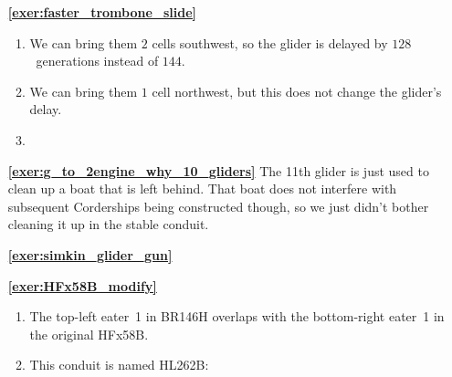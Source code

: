 \begin{multicols}{2}
\begin{itemize}[leftmargin=0em]
\begin{enumerate}[leftmargin=1.5em,label=\bf\color{ocre}(\alph*)]
			\item {} \\
			
			\item {} \\
		\end{enumerate}
	

		\item[\bf\color{ocre}\sffamily\ref{exer:faster_trombone_slide}] \begin{enumerate}[leftmargin=1.5em,label=\bf\color{ocre}(\alph*)]
			\item We can bring them $2$ cells southwest, so the glider is delayed by $128$~generations instead of $144$.
			
			\item We can bring them $1$ cell northwest, but this does not change the glider's delay.
			
			\item {} \\
		\end{enumerate}
		
		
		
		\item[\bf\color{ocre}\sffamily\ref{exer:g_to_2engine_why_10_gliders}] The 11th glider is just used to clean up a boat that is left behind. That boat does not interfere with subsequent Corderships being constructed though, so we just didn't bother cleaning it up in the stable conduit.\\
		
		
		
		\item[\bf\color{ocre}\sffamily\ref{exer:simkin_glider_gun}]  \\
		
		
		\item[\bf\color{ocre}\sffamily\ref{exer:HFx58B_modify}] \begin{enumerate}[leftmargin=1.5em,label=\bf\color{ocre}(\alph*)]
			\item The top-left eater~1 in BR146H overlaps with the bottom-right eater~1 in the original HFx58B.
			
			\item This conduit is named HL262B:
			\begin{center}
			\end{center}
		\end{enumerate}
		

\end{itemize}
\end{multicols}
